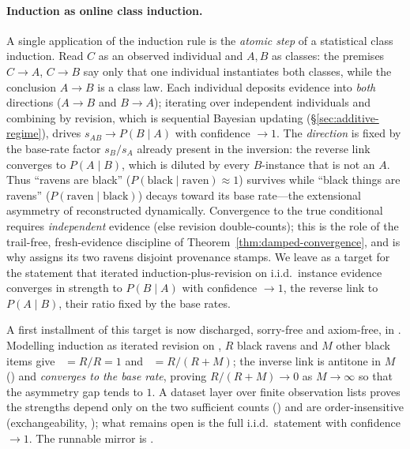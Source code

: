 \documentclass[11pt,openany]{report}
\begin{document}
\paragraph{Induction as online class induction.}
A single application of the induction rule is the \emph{atomic step} of a
statistical class induction.  Read $C$ as an observed individual and $A,B$ as
classes: the premises $C\!\to\!A$, $C\!\to\!B$ say only that one individual
instantiates both classes, while the conclusion $A\!\to\!B$ is a class law.
Each individual deposits evidence into \emph{both} directions ($A\!\to\!B$ and
$B\!\to\!A$); iterating over independent individuals and combining by revision,
which is sequential Bayesian updating (\S\ref{sec:additive-regime}), drives
$s_{AB}\to P(B\mid A)$ with confidence $\to 1$.  The \emph{direction} is fixed
by the base-rate factor $s_B/s_A$ already present in the inversion: the reverse
link converges to $P(A\mid B)$, which is diluted by every $B$-instance that is
not an $A$.  Thus ``ravens are black'' ($P(\mathrm{black}\mid\mathrm{raven})
\approx 1$) survives while ``black things are ravens''
($P(\mathrm{raven}\mid\mathrm{black})$) decays toward its base rate---the
extensional asymmetry of  reconstructed dynamically.
Convergence to the true conditional requires \emph{independent} evidence (else
revision double-counts); this is the role of the trail-free, fresh-evidence
discipline of Theorem~\ref{thm:damped-convergence}, and is why
 assigns its two ravens disjoint provenance stamps.  We
leave as a target for
 the statement
that iterated induction-plus-revision on i.i.d.\ instance evidence converges in
strength to $P(B\mid A)$ with confidence $\to 1$, the reverse link to
$P(A\mid B)$, their ratio fixed by the base rates.

A first installment of this target is now discharged, sorry-free and
axiom-free, in .
Modelling induction as iterated revision on , $R$ black
ravens and $M$ other black items give ~$=R/R=1$ and
~$=R/(R+M)$; the inverse link is antitone in $M$
() and \emph{converges to the base rate},
 proving $R/(R+M)\to 0$ as
$M\to\infty$ so that the asymmetry gap tends to $1$.  A dataset layer over
finite observation lists proves the strengths depend only on the two sufficient
counts () and are order-insensitive
(exchangeability, ); what remains open is the
full i.i.d.\ statement with confidence $\to 1$.  The runnable mirror is
.
\end{document}
